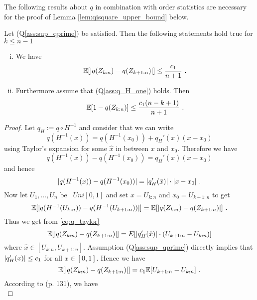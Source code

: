 %
The following results about $q$ in  combination with order statistics are necessary for the proof of Lemma \ref{lem:qisquare_upper_bound} below. 
\begin{lemma} \label{lem:q_spacings}
	Let (Q\ref{ass:sup_qprime}) be satisfied. Then the following statements hold true for $k\leq n-1$
	\begin{enumerate}[(i)]
		\item We have
		\begin{equation}
			\mathbb{E}[|q(Z_{k:n})-q(Z_{k+1:n})|] \leq \frac{c_1}{n+1}\textrm{ .}
			\label{eq:q_spacings_a}
		\end{equation}
		\item Furthermore assume that (Q\ref{ass:q_H_one}) holds. Then
		\begin{equation}
			\mathbb{E}[1-q(Z_{k:n})] \leq \frac{c_1(n-k+1)}{n+1}\textrm{ .}
			\label{eq:q_spacings_lastk}
		\end{equation}
	\end{enumerate}
	\begin{proof}
		Let $q_H := q\circ H^{-1}$ and consider that we can write
		\begin{equation}
			q(H^{-1}(x)) = q(H^{-1}(x_0)) + q_H'(\hat{x})(x-x_0)
			\label{eq:taylor_q}
		\end{equation}
		using Taylor's expansion for some $\hat{x}$ in between $x$ and $x_0$. Therefore we have 
		$$q(H^{-1}(x)) - q(H^{-1}(x_0)) = q_H'(\hat{x})(x-x_0)$$
		and hence
		\begin{equation}
			|q(H^{-1}(x)) - q(H^{-1}(x_0))| = |q_H'(\hat{x})|\cdot |x-x_0|\textrm{ .}
			\label{eq:q_taylor}
		\end{equation}
		Now let $U_1, \dots,U_n$ be \iid\ $Uni[0,1]$ and set $x=U_{k:n}$ and $x_0=U_{k+1:n}$ to get
		\begin{equation*}
			\mathbb{E}[|q(H^{-1}(U_{k:n})) - q(H^{-1}(U_{k+1:n}))|] = \mathbb{E}[|q(Z_{k:n}) - q(Z_{k+1:n})|]\textrm{ .}
		\end{equation*}
		Thus we get from \eqref{eq:q_taylor}
		\begin{equation*}
			\mathbb{E}[|q(Z_{k:n}) - q(Z_{k+1:n})|] = E[|q_H'(\hat{x})|\cdot (U_{k+1:n} - U_{k:n})]
		\end{equation*}
		where $\hat{x} \in [U_{k:n}, U_{k+1:n}]$.
		Assumption (Q\ref{ass:sup_qprime}) directly implies that $\lvert q_H'(x)\rvert\leq c_1$ for all $x \in [0,1]$. Hence we have
		$$\mathbb{E}[|q(Z_{k:n}) - q(Z_{k+1:n})|] = c_1 \mathbb{E}[U_{k+1:n} - U_{k:n}]\textrm{ .}$$
		According to \cite{shorack2009empirical} (p. 131), we have
		\begin{equation}

\end{equation}
\end{proof}
\end{lemma}
